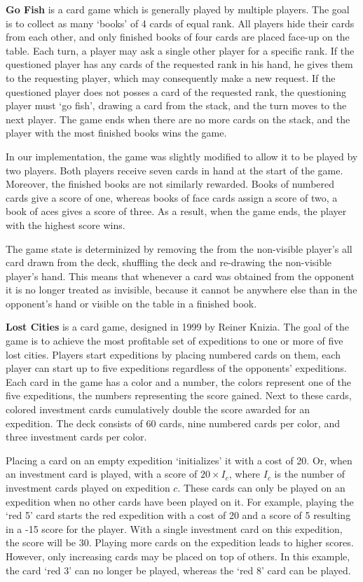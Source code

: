\documentclass[a4paper]{llncs}
\begin{document}
{\sc \bf Go Fish} is a card game which is generally played by multiple players. The goal is to collect as many `books' of 4 cards of equal rank. All players hide their cards from each other, and only finished books of four cards are placed face-up on the table. Each turn, a player may ask a single other player for a specific rank. If the questioned player has any cards of the requested rank in his hand, he gives them to the requesting player, which may consequently make a new request. If the questioned player does not posses a card of the requested rank, the questioning player must `go fish', drawing a card from the stack, and the turn moves to the next player. The game ends when there are no more cards on the stack, and the player with the most finished books wins the game.

In our implementation, the game was slightly modified to allow it to be played by two players. Both players receive seven cards in hand at the start of the game. Moreover, the finished books are not similarly rewarded. Books of numbered cards give a score of one, whereas books of face cards assign a score of two, a book of aces gives a score of three. As a result, when the game ends, the player with the highest score wins.

The game state is determinized by removing the from the non-visible player's all card drawn from the deck, shuffling the deck and re-drawing the non-visible player's hand. This means that whenever a card was obtained from the opponent it is no longer treated as invisible, because it cannot be anywhere else than in the opponent's hand or visible on the table in a finished book.

{\sc \bf Lost Cities} is a card game, designed in 1999 by Reiner Knizia. The goal of the game is to achieve the most profitable set of expeditions to one or more of five lost cities. Players start expeditions by placing numbered cards on them, each player can start up to five expeditions regardless of the opponents' expeditions. Each card in the game has a color and a number, the colors represent one of the five expeditions, the numbers representing the score gained. Next to these cards, colored investment cards cumulatively double the score awarded for an expedition. The deck consists of 60 cards, nine numbered cards per color, and three investment cards per color.

Placing a card on an empty expedition `initializes' it with a cost of 20. Or, when an investment card is played, with a score of $20\times I_c$, where $I_c$ is the number of investment cards played on expedition $c$. These cards can only be played on an expedition when no other cards have been played on it. For example, playing the `red 5' card starts the red expedition with a cost of 20 and a score of 5 resulting in a -15 score for the player. With a single investment card on this expedition, the score will be 30. Playing more cards on the expedition leads to higher scores. However, only increasing cards may be placed on top of others. In this example, the card `red 3' can no longer be played, whereas the `red 8' card can be played.
\end{document}

